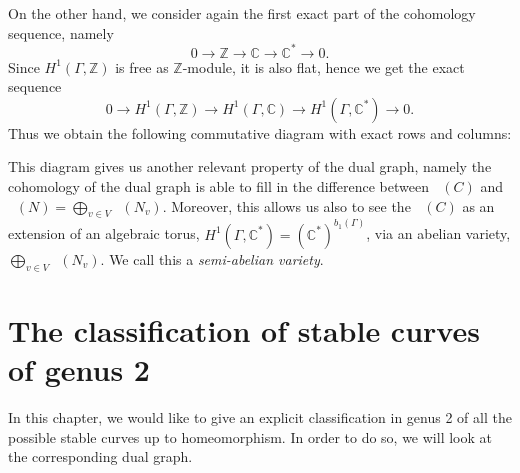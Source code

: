 \documentclass[a4paper,12 pt,titlepage,twoside]{book}
\newcommand{\numberset}{\mathbb}
\newcommand{\Z}{\numberset{Z}}
\newcommand{\C}{\numberset{C}}
\newcommand*{\isoarrow}[1]{\arrow[#1,"\rotatebox{90}{\(\sim\)}"]}
\DeclareMathOperator{\pico}{Pic^0}
\theoremstyle{plain}
\theoremstyle{theorem}
\theoremstyle{definition}
\theoremstyle{remark}
\begin{document}
	On the other hand, we consider again the first exact part of the cohomology sequence, namely $$0 \rightarrow \Z \rightarrow \C \rightarrow \C^* \rightarrow 0.$$ Since $H^1(\Gamma,\Z)$ is free as $\Z$-module, it is also flat, hence we get the exact sequence $$0 \rightarrow H^1(\Gamma,\Z) \rightarrow H^1(\Gamma,\C) \rightarrow H^1(\Gamma,\C^*) \rightarrow 0.$$
	Thus we obtain the following commutative diagram with exact rows and columns:
	\begin{center}
	\end{center}
	This diagram gives us another relevant property of the dual graph, namely the cohomology of the dual graph is able to fill in the difference between $\pico(C)$ and $\pico(N) = \bigoplus_{v \in V} \pico(N_v).$ Moreover, this allows us also to see the $\pico(C)$ as an extension of an algebraic torus, $H^1(\Gamma,\C^*) = (\C^*)^{b_1(\Gamma)}$, via an abelian variety, $\bigoplus_{v \in V} \pico(N_v)$. We call this a \emph{semi-abelian variety}.
	\newpage
\chapter{The classification of stable curves of genus 2}\label{sec: classification of stable curves genus 2}
	In this chapter, we would like to give an explicit classification in genus 2 of all the possible stable curves up to homeomorphism. In order to do so, we will look at the corresponding dual graph.
	
\end{document}
